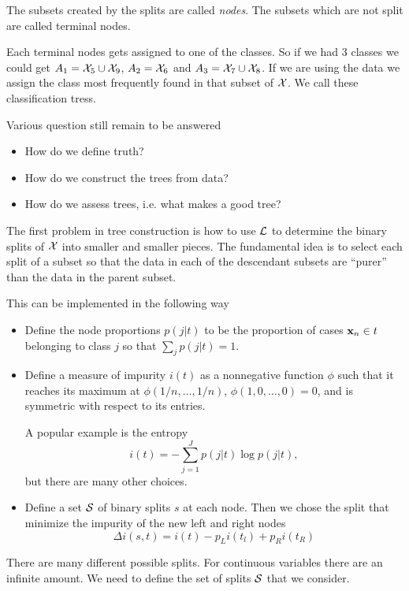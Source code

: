 The subsets created by the splits are called {\it nodes}. The subsets
which are not split are called terminal nodes. 

Each terminal nodes gets
assigned to one of the classes. So if we had 3 classes we could get $A_1
= {\cal X}_5 \cup {\cal X}_9$, $A_2 ={\cal X}_6$ and $A_3 ={\cal X}_7 \cup {\cal X}_8$.
If we are using  the data we assign the class most frequently found in
that subset of ${\cal X}$. We call these classification tress.

Various question still remain to be answered
\begin{itemize}
\item How do we define truth?
\item How do we construct the trees from data?
\item How do we assess trees, i.e. what makes a good tree?
\end{itemize}

The first problem in tree construction is how to use $\cal L$ to
determine the binary splits of $\cal X$ into smaller and smaller
pieces. The fundamental idea is to select each split of a subset so that
the data in each of the descendant subsets are ``purer'' than the data
in the parent subset.

This can be implemented in the following way

\begin{itemize}
\item Define the node proportions $p(j|t)$ to be the proportion of
  cases ${\mathbf x}_n \in t$ belonging to class $j$ so that $\sum_j p(j|t) =
  1$.

\item Define a measure of impurity $i(t)$ as a nonnegative function
  $\phi$ such that it reaches its maximum at $\phi(1/n,\dots,1/n)$,
$\phi(1,0,\dots,0)=0$,  and is symmetric with respect to its entries.

A popular example is the entropy
\[
i(t) = - \sum_{j=1}^J p(j|t) \log p(j|t),
\]
but there are many other choices.

\item Define a set $\cal S$ of binary splits $s$ at each node. Then we
  chose the split that minimize the impurity of the new left and right
  nodes
\[
\Delta i(s,t) = i(t) - p_L i(t_l) + p_R i(t_R)
\]

\end{itemize}


There are many different possible splits. For continuous variables
there are an infinite amount. We need to define the set of splits
$\cal S$ that we consider.

